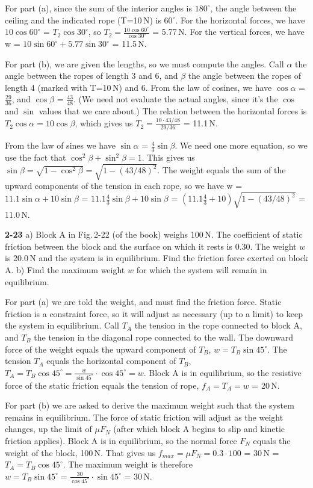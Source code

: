 \documentclass{amsart}
\begin{document}
For part (a), since the sum of the interior angles is $180^\circ$,
the angle between the ceiling and the indicated rope (T=10\,N) is $60^\circ$.
For the horizontal forces, we have $10 \cos 60^\circ$ = $T_2 \cos 30^\circ$,
so $T_2 = \frac{10 \cos 60^\circ}{\cos 30^\circ}$ = 5.77\,N.
For the vertical forces, we have w = $10 \sin 60^\circ + 5.77 \sin 30^\circ$ = 11.5\,N.

For part (b), we are given the lengths, so we must compute the angles.
Call $\alpha$ the angle between the ropes of length 3 and 6, and $\beta$ the angle
between the ropes of length 4 (marked with T=10\,N) and 6.
From the law of cosines, we have $\cos \alpha$ = $\frac{29}{36}$,
and $\cos \beta$ = $\frac{43}{48}$.  (We need not evaluate the actual angles,
since it's the $\cos$ and $\sin$ values that we care about.)
The relation between the horizontal forces is $T_2 \cos \alpha = 10 \cos \beta$,
which gives us $T_2 = \frac{10 \cdot 43/48}{29/36}$ = 11.1\,N.

From the law of sines we have $\sin \alpha$ = $\frac{4}{3} \sin \beta$.
We need one more equation, so we use the fact that $\cos^2 \beta + \sin^2 \beta = 1$.
This gives us $\sin \beta = \sqrt{1-\cos^2 \beta} = \sqrt{1-(43/48)^2}$.
The weight equals the sum of the upward components of the tension in each rope,
so we have w = $11.1 \sin \alpha + 10 \sin \beta$ = $11.1 \frac{4}{3} \sin \beta + 10 \sin \beta$ =
$(11.1 \frac{4}{3} + 10) \sqrt{1-(43/48)^2}$ = 11.0\,N.

\vspace{\baselineskip}
\noindent
\textbf{2-23}\newline
a) Block A in Fig.\,2-22 (of the book) weighs 100\,N.
The coefficient of static friction between the block and the surface on which it rests
is 0.30.  The weight $w$ is 20.0\,N and the system is in equilibrium.
Find the friction force exerted on block A.\newline
b) Find the maximum weight $w$ for which the system will remain in equilibrium.

For part (a) we are told the weight, and must find the friction force.
Static friction is a constraint force, so it will adjust as necessary (up to a limit)
to keep the system in equilibrium.
Call $T_A$ the tension in the rope connected to block A, 
and $T_B$ the tension in the diagonal rope connected to the wall.
The downward force of the weight equals the upward component of $T_B$, 
$w = T_B \sin 45^\circ$.  The tension $T_A$ equals the horizontal component
of $T_B$, $T_A = T_B \cos 45^\circ = \frac{w}{\sin 45^\circ} \cdot \cos 45^\circ = w$.
Block A is in equilibrium, so the resistive force of the static friction equals the tension
of rope, $f_A = T_A = w$ = 20\,N.

For part (b) we are asked to derive the maximum weight such that the system remains in equilibrium.
The force of static friction will adjust as the weight changes, up the limit of $\mu F_N$
(after which block A begins to slip and kinetic friction applies).  
Block A is in equilibrium,
so the normal force $F_N$ equals the weight of the block, 100\,N.
That gives us $f_{max} = \mu F_N = 0.3 \cdot 100$ = 30\,N = $T_A = T_B \cos 45^\circ$.
The maximum weight is therefore $w = T_B \sin 45^\circ = \frac{30}{\cos 45^\circ} \cdot \sin 45^\circ$ = 30\,N.
\end{document}
